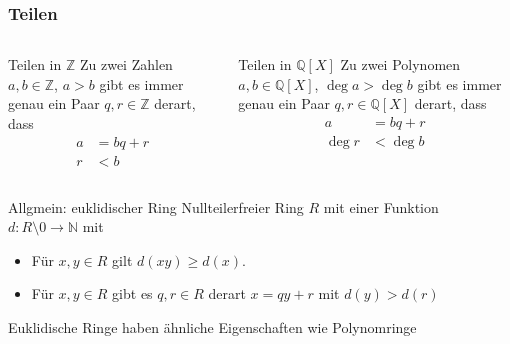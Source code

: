 %
%
%
\begin{frame}[t]
\frametitle{Teilen}
\vspace{-15pt}
\begin{columns}[t,onlytextwidth]
\begin{column}{0.48\textwidth}
\begin{block}{Teilen in $\mathbb{Z}$}
Zu zwei Zahlen $a,b\in \mathbb{Z}$, $a>b$ gibt es
immer genau ein Paar $q,r\in\mathbb{Z}$ derart, dass
\begin{align*}
a&=bq+r
\\
r&< b
\end{align*}
\end{block}
\end{column}
\begin{column}{0.48\textwidth}
\begin{block}{Teilen in $\mathbb{Q}[X]$}
Zu zwei Polynomen $a,b\in\mathbb{Q}[X]$, $\deg a > \deg b$
gibt es 
immer genau ein Paar $q,r\in\mathbb{Q}[X]$ derart, dass
\begin{align*}
a&=bq+r
\\
\deg r&< \deg b
\end{align*}
\end{block}
\end{column}
\end{columns}
\begin{block}{Allgmein: euklidischer Ring}
Nullteilerfreier Ring $R$ mit einer Funktion
$d\colon R\setminus{0}\to\mathbb{N}$ mit
\begin{itemize}
\item Für $x,y\in R$ gilt $d(xy) \ge d(x)$.
\item Für $x,y\in R$ gibt es $q,r\in R$ derart
$x=qy +r$ mit $d(y)>d(r)$
\end{itemize}
Euklidische Ringe haben ähnliche Eigenschaften wie Polynomringe
\end{block}
\end{frame}
